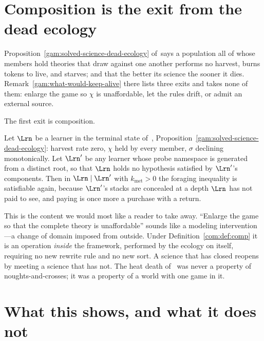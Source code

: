 \section{Composition is the exit from the dead ecology}\label{com:S13}

Proposition~\ref{gam:solved-science-dead-ecology} of~\chGame says a population all of whose members hold theories that draw
against one another performs no harvest, burns tokens to live, and starves; and that the better
its science the sooner it dies. Remark~\ref{gam:what-would-keep-alive} there lists three exits and takes none of them: enlarge
the game so $\chi$ is unaffordable, let the rules drift, or admit an external source.

The first exit is composition.

\begin{proposition}\label{com:composition-restores-harvest}
Let $\Lrn$ be a learner in the terminal state of~\chGame, Proposition~\ref{gam:solved-science-dead-ecology}: harvest rate zero,
$\chi$ held by every member, $\sigma$ declining monotonically. Let $\Lrn'$ be any learner whose
probe namespace is generated from a distinct root, so that $\Lrn$ holds no hypothesis satisfied
by $\Lrn'$'s components. Then in $\Lrn \mid \Lrn'$ with $k_{\mathrm{met}} > 0$ the foraging
inequality is satisfiable again, because $\Lrn'$'s stacks are concealed at a depth $\Lrn$ has not
paid to see, and paying is once more a purchase with a return.
\end{proposition}

\begin{remark}\label{com:enlarging-game-composing-same}
This is the content we would most like a reader to take away. ``Enlarge the game so that the
complete theory is unaffordable'' sounds like a modeling intervention---a change of domain
imposed from outside. Under Definition~\ref{com:def:comp} it is an operation \emph{inside} the
framework, performed by the ecology on itself, requiring no new rewrite rule and no new sort. A
science that has closed reopens by meeting a science that has not. The heat death of~\chGame
was never a property of noughts-and-crosses; it was a property of a world with one game in it.
\end{remark}

\section{What this shows, and what it does not}\label{com:sec:notshown}\label{com:S14}

